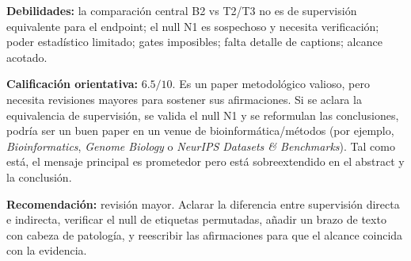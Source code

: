 \documentclass[11pt,a4paper]{article}
\begin{document}
\textbf{Debilidades:} la comparación central B2 vs T2/T3 no es de supervisión equivalente para el endpoint; el null N1 es sospechoso y necesita verificación; poder estadístico limitado; gates imposibles; falta detalle de captions; alcance acotado.

\textbf{Calificación orientativa:} $6.5/10$. Es un paper metodológico valioso, pero necesita revisiones mayores para sostener sus afirmaciones. Si se aclara la equivalencia de supervisión, se valida el null N1 y se reformulan las conclusiones, podría ser un buen paper en un venue de bioinformática/métodos (por ejemplo, \textit{Bioinformatics}, \textit{Genome Biology} o \textit{NeurIPS Datasets \& Benchmarks}). Tal como está, el mensaje principal es prometedor pero está sobreextendido en el abstract y la conclusión.

\textbf{Recomendación:} revisión mayor. Aclarar la diferencia entre supervisión directa e indirecta, verificar el null de etiquetas permutadas, añadir un brazo de texto con cabeza de patología, y reescribir las afirmaciones para que el alcance coincida con la evidencia.
\end{document}
